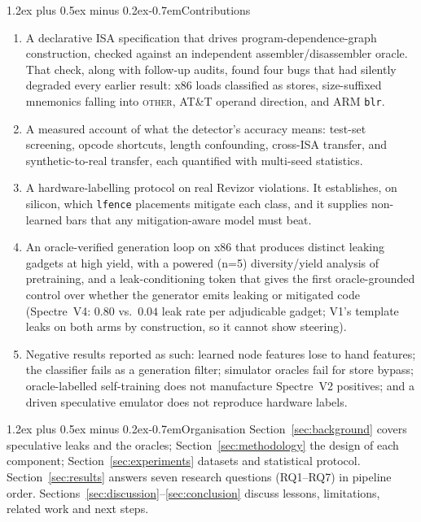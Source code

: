 \documentclass[conference]{IEEEtran}
\makeatletter
\renewcommand\paragraph{\@startsection{paragraph}{4}{\z@}%
  {1.2ex plus 0.5ex minus 0.2ex}{-0.7em}{\normalfont\normalsize\bfseries}}
\makeatother
\begin{document}
\paragraph{Contributions}
\begin{enumerate}[itemsep=1pt,leftmargin=1.4em]
  \item A declarative ISA specification that drives program-dependence-graph
    construction, checked against an independent assembler/disassembler
    oracle. That check, along with follow-up audits, found four bugs that had
    silently degraded every earlier result: x86 loads classified as stores,
    size-suffixed mnemonics falling into \textsc{other}, AT\&T operand
    direction, and ARM \texttt{blr}.
  \item A measured account of what the detector's accuracy means: test-set
    screening, opcode shortcuts, length confounding, cross-ISA transfer, and
    synthetic-to-real transfer, each quantified with multi-seed statistics.
  \item A hardware-labelling protocol on real Revizor violations. It
    establishes, on silicon, which \texttt{lfence} placements mitigate each
    class, and it supplies non-learned bars that any mitigation-aware model
    must beat.
  \item An oracle-verified generation loop on x86 that produces distinct
    leaking gadgets at high yield, with a powered (n=5) diversity/yield
    analysis of pretraining, and a leak-conditioning token that gives the first
    oracle-grounded control over whether the generator emits leaking or
    mitigated code (Spectre~V4: $0.80$ vs.\ $0.04$ leak rate per adjudicable
    gadget; V1's template leaks on both arms by construction, so it cannot
    show steering).
  \item Negative results reported as such: learned node features lose to
    hand features; the classifier fails as a generation filter; simulator
    oracles fail for store bypass; oracle-labelled self-training does not
    manufacture Spectre~V2 positives; and a driven speculative emulator does
    not reproduce hardware labels.
\end{enumerate}

\paragraph{Organisation} Section~\ref{sec:background} covers speculative
leaks and the oracles; Section~\ref{sec:methodology} the design of each
component; Section~\ref{sec:experiments} datasets and statistical protocol.
Section~\ref{sec:results} answers seven research questions (RQ1--RQ7) in
pipeline order. Sections~\ref{sec:discussion}--\ref{sec:conclusion} discuss
lessons, limitations, related work and next steps.
\end{document}
